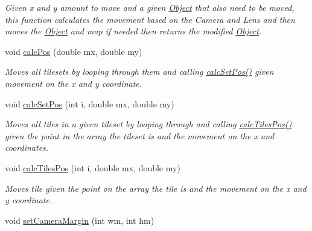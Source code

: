 \begin{DoxyCompactItemize}
\begin{DoxyCompactList}\small\item\em Given x and y amount to move and a given \hyperlink{classObject}{Object} that also need to be moved, this function calculates the movement based on the Camera and Lens and then moves the \hyperlink{classObject}{Object} and map if needed then returns the modified \hyperlink{classObject}{Object}. \end{DoxyCompactList}\item 
void \hyperlink{classTilesettmp_afc75577cc6ee248ec8a7690f7db03fbf}{calc\+Pos} (double mx, double my)\hypertarget{classTilesettmp_afc75577cc6ee248ec8a7690f7db03fbf}{}\label{classTilesettmp_afc75577cc6ee248ec8a7690f7db03fbf}

\begin{DoxyCompactList}\small\item\em Moves all tilesets by looping through them and calling \hyperlink{classTilesettmp_a902decf05c486bf3989a3fd402846be5}{calc\+Set\+Pos()} given movement on the x and y coordinate. \end{DoxyCompactList}\item 
void \hyperlink{classTilesettmp_a902decf05c486bf3989a3fd402846be5}{calc\+Set\+Pos} (int i, double mx, double my)\hypertarget{classTilesettmp_a902decf05c486bf3989a3fd402846be5}{}\label{classTilesettmp_a902decf05c486bf3989a3fd402846be5}

\begin{DoxyCompactList}\small\item\em Moves all tiles in a given tileset by looping through and calling \hyperlink{classTilesettmp_aea17e983c4ee1c38baab6053a6efd385}{calc\+Tiles\+Pos()} given the point in the array the tileset is and the movement on the x and coordinates. \end{DoxyCompactList}\item 
void \hyperlink{classTilesettmp_aea17e983c4ee1c38baab6053a6efd385}{calc\+Tiles\+Pos} (int i, double mx, double my)\hypertarget{classTilesettmp_aea17e983c4ee1c38baab6053a6efd385}{}\label{classTilesettmp_aea17e983c4ee1c38baab6053a6efd385}

\begin{DoxyCompactList}\small\item\em Moves tile given the point on the array the tile is and the movement on the x and y coordinate. \end{DoxyCompactList}\item 
void \hyperlink{classTilesettmp_a8d86933185e6a0044465709892a6f416}{set\+Camera\+Margin} (int wm, int hm)\hypertarget{classTilesettmp_a8d86933185e6a0044465709892a6f416}{}\label{classTilesettmp_a8d86933185e6a0044465709892a6f416}


\end{DoxyCompactItemize}

